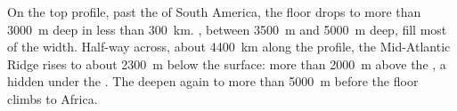 \begin{example}
On the top profile, past the  of South America, the floor
drops to more than \qty{3000}{m} deep in less than \qty{300}{km}. , between
\qty{3500}{m} and \qty{5000}{m} deep, fill most of the width. Half-way
across, about \qty{4400}{km} along the profile, the Mid-Atlantic Ridge rises
to about \qty{2300}{m} below the surface: more than \qty{2000}{m} above
the , a  hidden under the . The  deepen again
to more than \qty{5000}{m} before the floor climbs to Africa.
\end{example}

